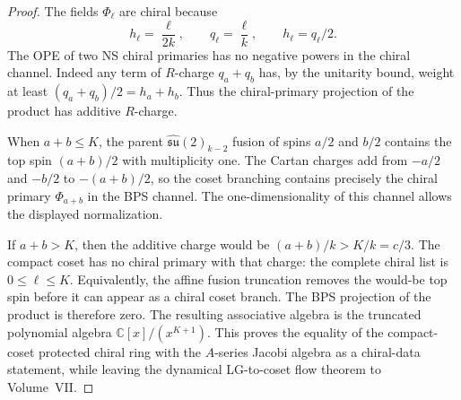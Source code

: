 \begin{proof}
The fields \(\Phi_\ell\) are chiral because
\[
  h_\ell=\frac{\ell}{2k},
  \qquad
  q_\ell=\frac{\ell}{k},
  \qquad
  h_\ell=q_\ell/2 .
\]
The OPE of two NS chiral primaries has no negative powers in the chiral
channel.  Indeed any term of \(R\)-charge \(q_a+q_b\) has, by the unitarity
bound, weight at least \((q_a+q_b)/2=h_a+h_b\).  Thus the chiral-primary
projection of the product has additive \(R\)-charge.

When \(a+b\le K\), the parent \(\widehat{\mathfrak{su}}(2)_{k-2}\) fusion of
spins \(a/2\) and \(b/2\) contains the top spin \((a+b)/2\) with
multiplicity one.  The Cartan charges add from \(-a/2\) and \(-b/2\) to
\(-(a+b)/2\), so the coset branching contains precisely the chiral primary
\(\Phi_{a+b}\) in the BPS channel.  The one-dimensionality of this channel
allows the displayed normalization.

If \(a+b>K\), then the additive charge would be \((a+b)/k>K/k=c/3\).  The
compact coset has no chiral primary with that charge: the complete chiral
list is \(0\le \ell\le K\).  Equivalently, the affine fusion truncation
removes the would-be top spin before it can appear as a chiral coset branch.
The BPS projection of the product is therefore zero.  The resulting
associative algebra is the truncated polynomial algebra
\(\mathbb C[x]/(x^{K+1})\).  This proves the equality of the compact-coset
protected chiral ring with the \(A\)-series Jacobi algebra as a chiral-data
statement, while leaving the dynamical LG-to-coset flow theorem to
Volume~VII.
\end{proof}


